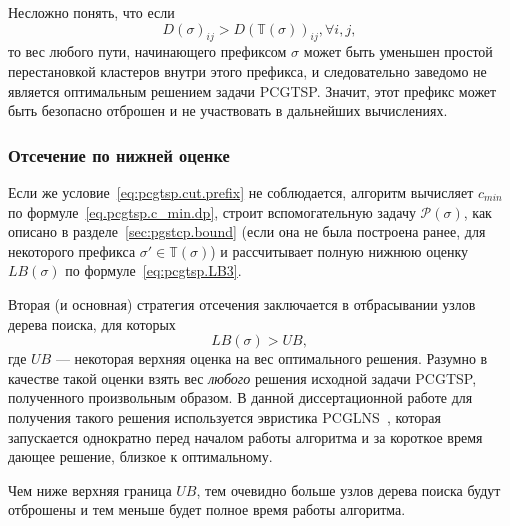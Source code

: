 Несложно понять, что если
\begin{equation}
  \label{eq:pcgtsp.cut.prefix}
  D(\sigma)_{ij} > D(\mathbb T(\sigma))_{ij},
  \forall i, j
  ,
\end{equation}
то вес любого пути,
начинающего префиксом $\sigma$
может быть уменьшен простой
перестановкой кластеров внутри этого префикса,
и следовательно заведомо
не является оптимальным решением задачи PCGTSP.
Значит, этот префикс может быть
безопасно отброшен и не участвовать в
дальнейших вычислениях.

\subsubsection{Отсечение по нижней оценке}

Если же условие~\eqref{eq:pcgtsp.cut.prefix}
не соблюдается,
алгоритм вычисляет
$c_{min}$
по формуле~\eqref{eq.pcgtsp.c_min.dp},
строит вспомогательную задачу
$\mathcal P(\sigma)$,
как описано в разделе~\ref{sec:pgstcp.bound}
(если она не была построена ранее,
для некоторого префикса
$\sigma' \in \mathbb T(\sigma)$)
и рассчитывает полную нижнюю оценку
$LB(\sigma)$
по формуле~\eqref{eq:pcgtsp.LB3}.

Вторая
(и основная)
стратегия отсечения заключается в отбрасывании узлов дерева поиска,
для которых
\begin{equation}
  \label{eq:pcgtsp.cut.lb}
  LB(\sigma)>UB
  ,
\end{equation}
где
$UB$ --- некоторая верхняя оценка на вес оптимального решения.
Разумно в качестве такой оценки
взять вес
\textit{любого}
решения исходной задачи PCGTSP,
полученного произвольным образом.
В данной диссертационной работе
для получения такого решения
используется эвристика
PCGLNS~\cite{KKP-optima2020},
которая запускается однократно
перед началом работы алгоритма
и за короткое время
дающее решение,
близкое к оптимальному.

Чем ниже верхняя граница $UB$,
тем очевидно больше узлов дерева поиска
будут отброшены и тем меньше будет
полное время работы алгоритма.
